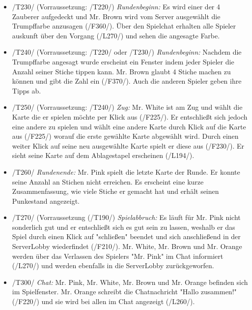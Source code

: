 \documentclass{article}
\begin{document}
\begin{itemize}
\begin{itemize}
		\item /T230/ (Vorraussetzung: /T220/) \textit{Rundenbeginn:} Es wird einer der 4 Zauberer aufgedeckt und Mr. Brown wird vom Server ausgewählt die Trumpffarbe anzusagen (/F360/). Über den Spielchat erhalten alle Spieler auskunft über den Vorgang (/L270/) und sehen die angesagte Farbe.
		
		\item /T240/ (Vorraussetzung: /T220/ oder /T230/) \textit{Rundenbeginn:} Nachdem die Trumpffarbe angesagt wurde erscheint ein Fenster indem jeder Spieler die Anzahl seiner Stiche tippen kann. Mr. Brown glaubt 4 Stiche machen zu können und gibt die Zahl ein (/F370/). Auch die anderen Spieler geben ihre Tipps ab.
		
		\item /T250/ (Vorraussetzung: /T240/) \textit{Zug:} Mr. White ist am Zug und wählt die Karte die er spielen möchte per Klick aus (/F225/). Er entschließt sich jedoch eine andere zu spielen und wählt eine andere Karte durch Klick auf die Karte aus (/F225/) worauf die erste gewählte Karte abgewählt wird. Durch einen weiter Klick auf seine neu ausgewählte Karte spielt er diese aus (/F230/). Er sieht seine Karte auf dem Ablagestapel erscheinen (/L194/).
		
		\item /T260/ \textit{Rundenende:} Mr. Pink spielt die letzte Karte der Runde. Er konnte seine Anzahl an Stichen nicht erreichen. Es erscheint eine kurze Zusammenfassung, wie viele Stiche er gemacht hat und erhält seinen Punkestand angezeigt.
		
		\item /T270/ (Vorraussetzung (/T190/) \textit{Spielabbruch:} Es läuft für Mr. Pink nicht sonderlich gut und er entschließt sich es gut sein zu lassen, weshalb er das Spiel durch einen Klick auf "schließen" beendet und sich anschließend in der ServerLobby wiederfindet (/F210/). Mr. White, Mr. Brown und Mr. Orange werden über das Verlassen des Spielers "Mr. Pink" im Chat informiert (/L270/) und werden ebenfalls in die ServerLobby zurückgeworfen.
	
		\item /T300/ \textit{Chat:} Mr. Pink, Mr. White, Mr. Brown und Mr. Orange befinden sich im Spielfenster. Mr. Orange schreibt die Chatnachricht "Hallo zusammen!" (/F220/) und sie wird bei allen im Chat angezeigt (/L260/).
		
	\end{itemize}
\end{itemize}
\end{document}
